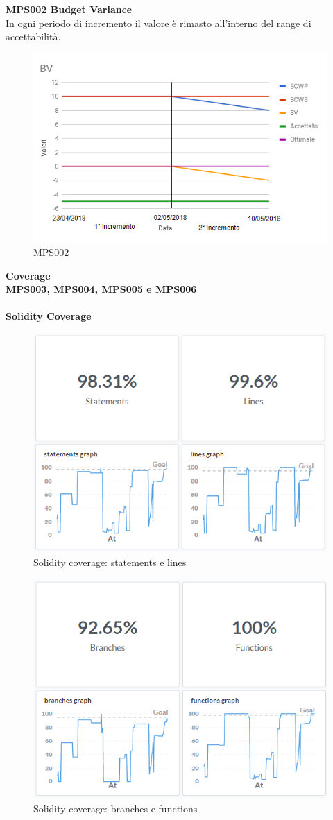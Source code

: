 \documentclass[PianoDiQualifica.tex]{subfiles}
\begin{document}
\textbf{MPS002 Budget Variance}\\
In ogni periodo di incremento il valore è rimasto all'interno del range di accettabilità.
\begin{figure}[H]
	\centering
	\includegraphics[width=0.8\linewidth]{RA/BV}
	\caption{MPS002}
	\label{fig:processi}
\end{figure}
\newpage
\textbf{Coverage}
\\
\textbf{MPS003, MPS004, MPS005 e MPS006}
\\\\
\textbf{Solidity Coverage}
\begin{figure}[H]
	\centering
	\includegraphics[width=0.6\linewidth]{RQ/SolidityCoverage1}
	\caption{Solidity coverage: statements e lines}
	\label{fig:processi}
\end{figure}
\begin{figure}[H]
	\centering
	\includegraphics[width=0.6\linewidth]{RQ/SolidityCoverage2}
	\caption{Solidity coverage: branches e functions}
	\label{fig:processi}
\end{figure}
\newpage
\end{document}
